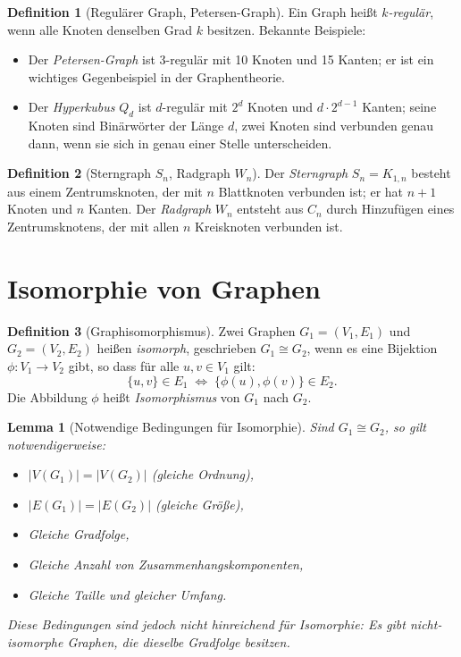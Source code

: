 ﻿\documentclass[a4paper,12pt,openany,oneside]{book}
\theoremstyle{definition}
\newtheorem{definition}{Definition}[chapter]
\theoremstyle{plain}
\newtheorem{lemma}{Lemma}[chapter]
\theoremstyle{remark}
\begin{document}
\begin{definition}[Regul\"arer Graph, Petersen-Graph]
  Ein Graph hei\ss{}t \emph{$k$-regul\"ar}, wenn alle Knoten denselben Grad $k$
  besitzen. Bekannte Beispiele:
  \begin{itemize}
    \item Der \emph{Petersen-Graph} ist 3-regul\"ar mit 10 Knoten und 15
          Kanten; er ist ein wichtiges Gegenbeispiel in der Graphentheorie.
    \item Der \emph{Hyperkubus} $Q_d$ ist $d$-regul\"ar mit $2^d$ Knoten und
          $d \cdot 2^{d-1}$ Kanten; seine Knoten sind Bin\"arw\"orter der
          L\"ange $d$, zwei Knoten sind verbunden genau dann, wenn sie sich in
          genau einer Stelle unterscheiden.
  \end{itemize}
\end{definition}

\begin{definition}[Sterngraph $S_n$, Radgraph $W_n$]
  Der \emph{Sterngraph} $S_n = K_{1,n}$ besteht aus einem Zentrumsknoten,
  der mit $n$ Blattknoten verbunden ist; er hat $n+1$ Knoten und $n$ Kanten.
  Der \emph{Radgraph} $W_n$ entsteht aus $C_n$ durch Hinzuf\"ugen eines
  Zentrumsknotens, der mit allen $n$ Kreisknoten verbunden ist.
\end{definition}

\section{Isomorphie von Graphen}

\begin{definition}[Graphisomorphismus]
  Zwei Graphen $G_1 = (V_1, E_1)$ und $G_2 = (V_2, E_2)$ hei\ss{}en
  \emph{isomorph}, geschrieben $G_1 \cong G_2$, wenn es eine Bijektion
  $\phi: V_1 \to V_2$ gibt, so dass f\"ur alle $u, v \in V_1$ gilt:
  \[
    \{u,v\} \in E_1 \;\Leftrightarrow\; \{\phi(u), \phi(v)\} \in E_2.
  \]
  Die Abbildung $\phi$ hei\ss{}t \emph{Isomorphismus} von $G_1$ nach $G_2$.
\end{definition}

\begin{lemma}[Notwendige Bedingungen f\"ur Isomorphie]
  Sind $G_1 \cong G_2$, so gilt notwendigerweise:
  \begin{itemize}
    \item $|V(G_1)| = |V(G_2)|$ (gleiche Ordnung),
    \item $|E(G_1)| = |E(G_2)|$ (gleiche Gr\"o\ss{}e),
    \item Gleiche Gradfolge,
    \item Gleiche Anzahl von Zusammenhangskomponenten,
    \item Gleiche Taille und gleicher Umfang.
  \end{itemize}
  Diese Bedingungen sind jedoch \emph{nicht hinreichend} f\"ur Isomorphie:
  Es gibt nicht-isomorphe Graphen, die dieselbe Gradfolge besitzen.
\end{lemma}
\end{document}
